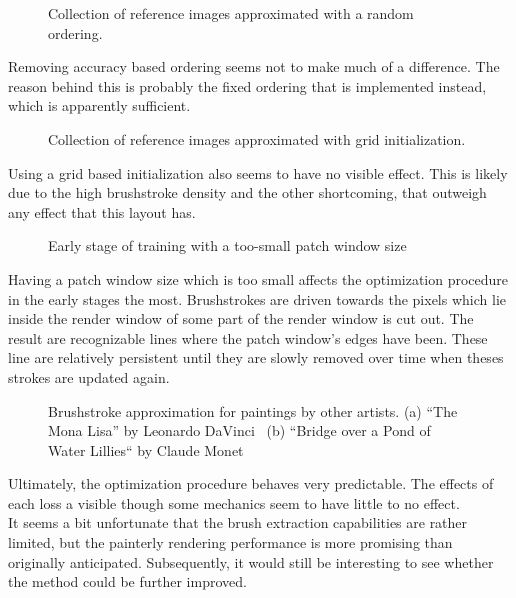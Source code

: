 \begin{figure*}
    \caption[]{Collection of reference images approximated with a random ordering.}
\end{figure*}
Removing accuracy based ordering seems not to make much of a difference.
The reason behind this is probably the fixed ordering that is implemented instead, which is apparently sufficient.

\begin{figure*}
    \caption[]{Collection of reference images approximated with grid initialization.}
\end{figure*}
Using a grid based initialization also seems to have no visible effect.
This is likely due to the high brushstroke density and the other shortcoming, that outweigh any effect that this layout has.

\begin{figure*}
    \caption[]{Early stage of training with a too-small patch window size}
\end{figure*}
Having a patch window size which is too small affects the optimization procedure in the early stages the most.
Brushstrokes are driven towards the pixels which lie inside the render window of some part of the render window is cut out.
The result are recognizable lines where the patch window's edges have been.
These line are relatively persistent until they are slowly removed over time when theses strokes are updated again. 

\begin{figure*}
    \caption[]{Brushstroke approximation for paintings by other artists. (a) ``The Mona Lisa'' by Leonardo DaVinci~\cite{monalisa} (b) ``Bridge over a Pond of Water Lillies`` by Claude Monet~\cite{bridge}}
\end{figure*}


Ultimately, the optimization procedure behaves very predictable.
The effects of each loss a visible though some mechanics seem to have little to no effect.\\
It seems a bit unfortunate that the brush extraction capabilities are rather limited, but the painterly rendering performance is more promising than originally anticipated.
Subsequently, it would still be interesting to see whether the method could be further improved.
